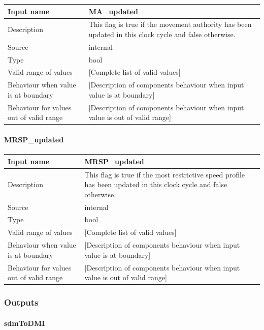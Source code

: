 \begin{longtable}{p{}p{}}
\toprule
Input name				& MA\_updated \\
\midrule
Description				& This flag is true if the movement authority has been updated in this clock cycle and false otherwise. \\
\midrule
Source					& internal \\ 
\midrule
Type					& bool \\
\midrule
Valid range of values	& [Complete list of valid values] \\
\midrule
Behaviour when value is at boundary	& [Description of components behaviour when input value is at boundary] \\
\midrule
Behaviour for values out of valid range	& [Description of components behaviour when input value is out of valid range] \\
\bottomrule
\end{longtable}


\paragraph{MRSP\_updated}

\begin{longtable}{p{}p{}}
\toprule
Input name				& MRSP\_updated \\
\midrule
Description				& This flag is true if the most restrictive speed profile has been updated in this clock cycle and false otherwise. \\
\midrule
Source					& internal \\ 
\midrule
Type					& bool \\
\midrule
Valid range of values	& [Complete list of valid values] \\
\midrule
Behaviour when value is at boundary	& [Description of components behaviour when input value is at boundary] \\
\midrule
Behaviour for values out of valid range	& [Description of components behaviour when input value is out of valid range] \\
\bottomrule
\end{longtable}


\subsubsection{Outputs}\label{s:trainsupervision}

\paragraph{sdmToDMI}

